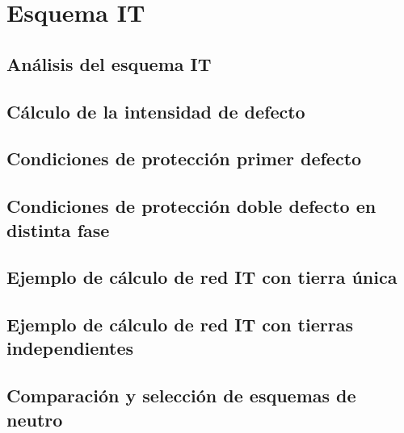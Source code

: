 \chapter{Esquema IT}
\section{Análisis del esquema IT}
\section{Cálculo de la intensidad de defecto}
\section{Condiciones de protección primer defecto}
\section{Condiciones de protección doble defecto en distinta fase}
\section{Ejemplo de cálculo de red IT con tierra única}
\section{Ejemplo de cálculo de red IT con tierras independientes}
\section{Comparación y selección de esquemas de neutro}
